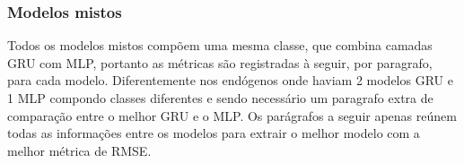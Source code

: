                  \begin{figure}[H]
            \end{figure}
            
    	    \subsubsection{Modelos mistos}
    	       Todos os modelos mistos compõem uma mesma classe, que combina camadas GRU com MLP, portanto as métricas são registradas à seguir, por paragrafo, para cada modelo. Diferentemente nos endógenos onde haviam 2 modelos GRU e 1 MLP compondo classes diferentes e sendo necessário um paragrafo extra de comparação entre o melhor GRU e o MLP.
    	       Os parágrafos a seguir apenas reúnem todas as informações entre os modelos para extrair o melhor modelo com a melhor métrica de RMSE.
    	    
